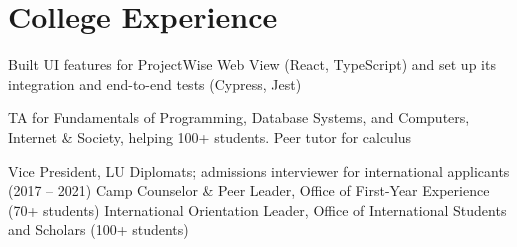 \documentclass[]{deedy-resume-openfont}
\begin{document}
\begin{minipage}[t]{0.66\textwidth}

\section{College Experience}

Built UI features for ProjectWise Web View (React, TypeScript) and set up its integration and end-to-end tests (Cypress, Jest)
\sectionsep

TA for Fundamentals of Programming, Database Systems, and Computers, Internet \& Society, helping 100+ students. Peer tutor for calculus
\sectionsep

\descript{}
Vice President, LU Diplomats; admissions interviewer for international applicants (2017 – 2021) \textbullet{} Camp Counselor \& Peer Leader, Office of First-Year Experience (70+ students) \textbullet{} International Orientation Leader, Office of International Students and Scholars (100+ students)

\end{minipage}
\end{document}
